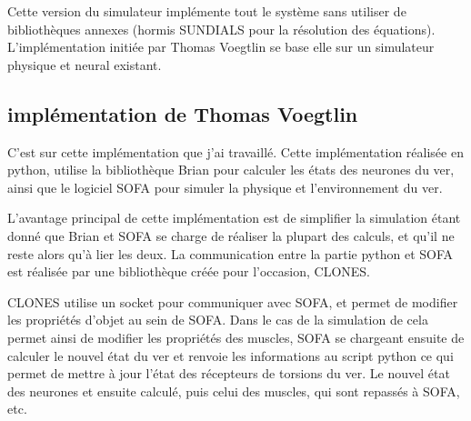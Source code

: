 Cette version du simulateur implémente tout le système sans utiliser de bibliothèques
annexes (hormis SUNDIALS pour la résolution des équations). L'implémentation initiée
par Thomas Voegtlin se base elle sur un simulateur physique et neural existant.


\subsection{implémentation de Thomas Voegtlin} %
\label{sub:implémentation de Thomas Voegtlin}

C'est sur cette implémentation que j'ai travaillé. Cette implémentation réalisée
en python, utilise la bibliothèque Brian\cite{Goodman2008} pour calculer les états
des neurones du ver, ainsi que le logiciel SOFA pour simuler la physique et
l'environnement du ver.

L'avantage principal de cette implémentation est de simplifier la simulation
étant donné que Brian et SOFA se charge de réaliser la plupart des calculs, et
qu'il ne reste alors qu'à lier les deux. La communication entre la partie
python et SOFA est réalisée par une bibliothèque créée pour l'occasion, CLONES.

CLONES utilise un socket pour communiquer avec SOFA, et permet de modifier les
propriétés d'objet au sein de SOFA. Dans le cas de la simulation de \celeg{}
cela permet ainsi de modifier les propriétés des muscles, SOFA se chargeant
ensuite de calculer le nouvel état du ver et renvoie les informations au script
python ce qui permet de mettre à jour l'état des récepteurs de torsions du ver.
Le nouvel état des neurones et ensuite calculé, puis celui des muscles, qui
sont repassés à SOFA, etc.



